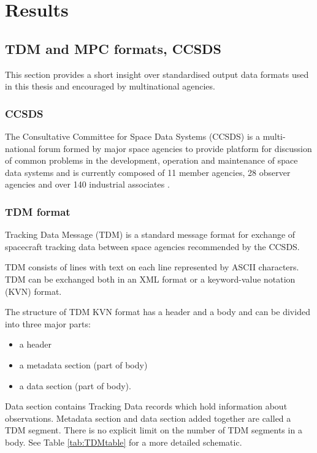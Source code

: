 \chapter{Results}\label{chap:results}

\section{TDM and MPC formats, CCSDS}\label{sec:tdm_ccsds}

	This section provides a short insight over standardised output data formats used in this thesis and encouraged by multinational agencies. 

\subsection{CCSDS}\label{subsec:ccsds}

	The Consultative Committee for Space Data Systems (CCSDS) is a multi-national forum formed by major space agencies to provide platform for discussion of common problems in the development, operation and maintenance of space data systems and is currently composed of 11 member agencies, 28 observer agencies and over 140 industrial associates \citep{ccsds}.

\subsection{TDM format}

	Tracking Data Message (TDM) is a standard message format for exchange of spacecraft tracking data between space agencies recommended by the CCSDS.
	
	TDM consists of lines with text on each line represented by ASCII characters. TDM can be exchanged both in an XML format or a keyword-value notation (KVN) format.
	
	The structure of TDM KVN format has a header and a body and can be divided into three major parts:
	
	\begin{itemize}
		\item a header
		\item a metadata section (part of body)
		\item a data section (part of body).
	\end{itemize}
	
	Data section contains Tracking Data records which hold information about observations. Metadata section and data section added together are called a TDM segment. There is no explicit limit on the number of TDM segments in a body. See Table \ref{tab:TDMtable} for a more detailed schematic.
	
